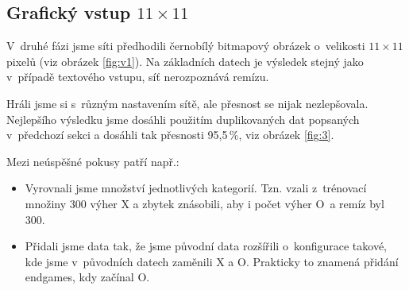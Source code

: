 \documentclass[10pt,a4paper]{article}
\begin{document}
\FloatBarrier
\subsection*{Grafický vstup $11\times 11$}
V~druhé fázi jsme síti předhodili černobílý bitmapový obrázek o~velikosti $11\times 11$ pixelů (viz obrázek \ref{fig:v1}). Na základních datech je výsledek stejný jako v~případě textového vstupu, síť nerozpoznává remízu.

Hráli jsme si s~různým nastavením sítě, ale přesnost se nijak nezlepšovala. Nejlepšího výsledku jsme dosáhli použitím duplikovaných dat popsaných v~předchozí sekci a dosáhli tak přesnosti 95,5\,\%, viz obrázek \ref{fig:3}.

Mezi neúspěšné pokusy patří např.:
\begin{itemize}
\item Vyrovnali jsme množství jednotlivých kategorií. Tzn. vzali z~trénovací množiny 300 výher X a zbytek znásobili, aby i počet výher O~a remíz byl 300.
\item Přidali jsme data tak, že jsme původní data rozšířili o~konfigurace takové, kde jsme v~původních datech zaměnili X a O. Prakticky to znamená přidání endgames, kdy začínal O.
\end{itemize}
\end{document}
